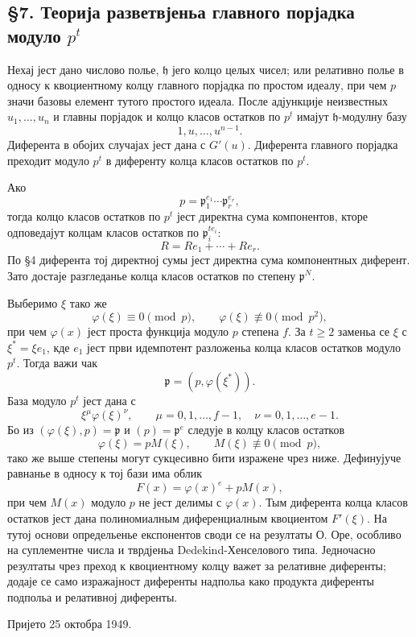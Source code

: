 ﻿\documentclass[11pt]{article}
\begin{document}
\subsection*{§7. Теорија разветвјеньа главного порјадка модуло \(p^t\)}

Нехај јест дано числово полье, \(\mathfrak h\) јего колцо целых чисел; или релативно полье в односу к квоциентному колцу главного порјадка по простом идеалу, при чем \(p\) значи базовы елемент тутого простого идеала. После адјункције неизвестных \(u_1,\ldots,u_n\) и главны порјадок и колцо класов остатков по \(p^t\) имајут \(\mathfrak h\)-модулну базу
\[
        1,u,\ldots,u^{n-1}.
\]
Диферента в обојих случајах јест дана с \(G'(u)\). Диферента главного порјадка преходит модуло \(p^t\) в диференту колца класов остатков по \(p^t\).

Ако
\[
        p=\mathfrak p_1^{e_1}
        \cdots\mathfrak p_r^{e_r},
\]
тогда колцо класов остатков по \(p^t\) јест директна сума компонентов, кторе одповедајут колцам класов остатков по \(\mathfrak p_i^{te_i}\):
\[
        R=Re_1+
        \cdots+Re_r.
\]
По §4 диферента тој директној сумы јест директна сума компонентных диферент. Зато достаје разгледанье колца класов остатков по степену \(\mathfrak p^N\).

Выберимо \(\xi\) тако же
\[
        \varphi(\xi)\equiv0\pmod p,
        \qquad
        \varphi(\xi)\not\equiv0\pmod {p^2},
\]
при чем \(\varphi(x)\) јест проста функција модуло \(p\) степена \(f\). За \(t\ge2\) заменьа се \(\xi\) с \(\xi^*=\xi e_1\), кде \(e_1\) јест први идемпотент разложеньа колца класов остатков модуло \(p^t\). Тогда важи чак
\[
        \mathfrak p=(p,\varphi(\xi^*)).
\]
База модуло \(p^t\) јест дана с
\[
        \xi^{\mu}\varphi(\xi)^{\nu},
        \qquad
        \mu=0,1,\ldots,f-1,
        \quad
        \nu=0,1,\ldots,e-1.
\]
Бо из \((\varphi(\xi),p)=\mathfrak p\) и \((p)=\mathfrak p^e\) следује в колцу класов остатков
\[
        \varphi(\xi)=pM(\xi),
        \qquad M(\xi)\not\equiv0\pmod p,
\]
тако же выше степены могут сукцесивно бити изражене чрез ниже. Дефинујуче равнанье в односу к тој бази има облик
\[
        F(x)=\varphi(x)^e+pM(x),
\]
при чем \(M(x)\) модуло \(p\) не јест делимы с \(\varphi(x)\). Тым диферента колца класов остатков јест дана полиномиалным диференциалным квоциентом \(F'(\xi)\). На тутој основи определьенье експонентов своди се на резултаты О. Оре, особливо на суплементне числа и тврдјеньа Dedekind-Хенселового типа. Једночасно резултаты чрез преход к квоциентному колцу важет за релативне диференты; додаје се само изражајност диференты надпольа како продукта диференты подпольа и релативној диференты.

\begin{center}
Пријето 25 октобра 1949.
\end{center}
\end{document}
